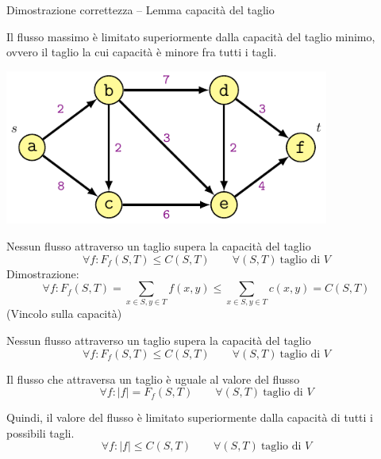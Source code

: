 \begin{frame}{Dimostrazione correttezza -- Lemma capacità del taglio}

\vspace{-3pt}
\begin{myboxtitle}
Il \alert{flusso massimo} è limitato superiormente dalla capacità del \alert{taglio minimo}, ovvero il taglio la cui capacità è minore fra tutti i tagli.
\end{myboxtitle}

\begin{overprint}
\begin{center}
\includegraphics[width=0.8\textwidth,page=1]{esempio.pdf}
\end{center}
\vspace{-12pt}

\medskip
\BIL
\item Nessun flusso attraverso un taglio supera la capacità del taglio
\smallskip
\[
 \forall f: F_f(S,T) \leq C(S,T) \qquad \forall (S,T)\ \textrm{taglio di $V$}
\]
Dimostrazione:
\smallskip
\[
  \forall f: F_f(S,T) = \sum_{x \in S, y \in T} f(x,y) \leq \sum_{x \in S, y \in T} c(x,y) = C(S,T)
\]
(Vincolo sulla capacità)
\EIL
{}

\medskip
\BIL
\item Nessun flusso attraverso un taglio supera la capacità del taglio
\smallskip
\[
  \forall f:F_f(S,T) \leq C(S,T) \qquad \forall (S,T)\ \textrm{taglio di $V$}
\]
\item Il flusso che attraversa un taglio è uguale al valore del flusso
\smallskip
\[
  \forall f:|f| = F_f(S,T) \qquad \forall (S,T)\ \textrm{taglio di $V$}
\]
\item Quindi, il valore del flusso è limitato superiormente dalla capacità
di tutti i possibili tagli. 
\smallskip
\[
\forall f: |f| \leq C(S,T) \qquad \forall (S,T)\ \textrm{taglio di $V$}
\]
\EIL
\end{overprint}

\end{frame}

